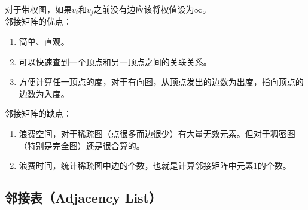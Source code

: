 \begin{table}[H]
	\centering
	\caption{带权图邻接矩阵}
\end{table}

对于带权图，如果$ v_i $和$ v_j $之前没有边应该将权值设为$ \infty $。\\

邻接矩阵的优点：

\begin{enumerate}
	\item 简单、直观。
	\item 可以快速查到一个顶点和另一顶点之间的关联关系。
	\item 方便计算任一顶点的度，对于有向图，从顶点发出的边数为出度，指向顶点的边数为入度。
\end{enumerate}

邻接矩阵的缺点：

\begin{enumerate}
	\item 浪费空间，对于稀疏图（点很多而边很少）有大量无效元素。但对于稠密图（特别是完全图）还是很合算的。
	\item 浪费时间，统计稀疏图中边的个数，也就是计算邻接矩阵中元素1的个数。
\end{enumerate}

\vspace{0.5cm}

\subsection{邻接表（Adjacency List）}


